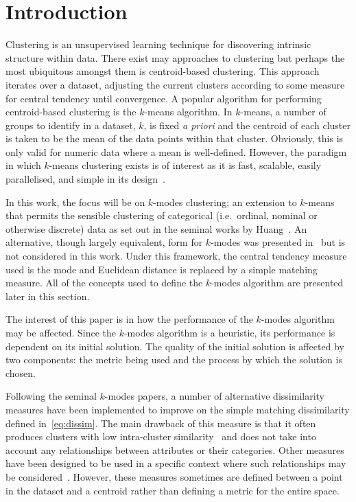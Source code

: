 \section{Introduction}\label{sec:intro}

Clustering is an unsupervised learning technique for discovering intrinsic
structure within data. There exist may approaches to clustering but perhaps the
most ubiquitous amongst them is centroid-based clustering. This approach
iterates over a dataset, adjusting the current clusters according to some
measure for central tendency until convergence. A popular algorithm for
performing centroid-based clustering is the \(k\)-means algorithm. In
\(k\)-means, a number of groups to identify in a dataset, \(k\), is fixed
\emph{a priori} and the centroid of each cluster is taken to be the mean of the
data points within that cluster. Obviously, this is only valid for numeric data
where a mean is well-defined. However, the paradigm in which \(k\)-means
clustering exists is of interest as it is fast, scalable, easily parallelised,
and simple in its design~\cite{Wu2009,Zhao2009}.

In this work, the focus will be on \(k\)-modes clustering; an extension to
\(k\)-means that permits the sensible clustering of categorical (i.e.\ ordinal,
nominal or otherwise discrete) data as set out in the seminal works by
Huang~\cite{Huang1997a,Huang1997b,Huang1998}. An alternative, though largely
equivalent, form for \(k\)-modes was presented in~\cite{Chaturvedi2001} but is
not considered in this work. Under this framework, the central tendency measure
used is the mode and Euclidean distance is replaced by a simple matching
measure. All of the concepts used to define the \(k\)-modes algorithm are
presented later in this section.

The interest of this paper is in how the performance of the \(k\)-modes
algorithm may be affected. Since the \(k\)-modes algorithm is a heuristic, its
performance is dependent on its initial solution. The quality of the initial
solution is affected by two components: the metric being used and the process by
which the solution is chosen.

Following the seminal \(k\)-modes papers, a number of alternative dissimilarity
measures have been implemented to improve on the simple matching dissimilarity
defined in~\eqref{eq:dissim}. The main drawback of this measure is that it often
produces clusters with low intra-cluster similarity~\cite{Ng2007} and does not
take into account any relationships between attributes or their categories.
Other measures have been designed to be used in a specific context where such
relationships may be considered~\cite{Cao2012,Yu2018,Zhou2016}. However, these
measures sometimes are defined between a point in the dataset and a centroid
rather than defining a metric for the entire space.

